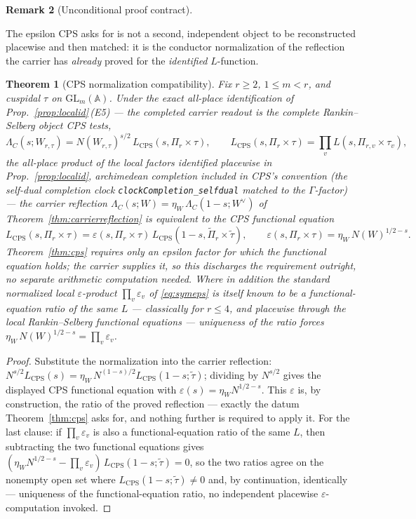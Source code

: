 \documentclass[11pt]{article}
\newtheorem{theorem}{Theorem}
\theoremstyle{definition}
\newtheorem{remark}[theorem]{Remark}
\begin{document}
\begin{remark}[Unconditional proof contract]
\begin{enumerate}
\noindent The epsilon CPS asks for is not a second, independent object to be reconstructed placewise and then
matched: it is the conductor normalization of the reflection the carrier has \emph{already} proved for the
\emph{identified} $L$-function.

\begin{theorem}[CPS normalization compatibility]\label{thm:cpsnorm}
Fix $r\ge2$, $1\le m<r$, and cuspidal $\tau$ on $\mathrm{GL}_m(\mathbb A)$. Under the exact all-place
identification of Prop.~\ref{prop:localid}\,\textup{(E5)} --- the completed carrier readout \emph{is} the
complete Rankin--Selberg object CPS tests,
\[
  \Lambda_C(s;W_{r,\tau})=N(W_{r,\tau})^{s/2}\,L_{\mathrm{CPS}}(s,\Pi_r\times\tau),\qquad
  L_{\mathrm{CPS}}(s,\Pi_r\times\tau)=\prod_v L(s,\Pi_{r,v}\times\tau_v),
\]
the all-place product of the local factors identified placewise in Prop.~\ref{prop:localid}, archimedean
completion included in CPS's convention (the self-dual completion clock
\texttt{clockCompletion\_selfdual} matched to the $\Gamma$-factor) --- the carrier reflection
$\Lambda_C(s;W)=\eta_W\,\Lambda_C(1-s;W^\vee)$ of Theorem~\ref{thm:carrierreflection} is \emph{equivalent} to the
CPS functional equation
\[
  L_{\mathrm{CPS}}(s,\Pi_r\times\tau)=\varepsilon(s,\Pi_r\times\tau)\,
  L_{\mathrm{CPS}}(1-s,\widetilde\Pi_r\times\widetilde\tau),\qquad
  \varepsilon(s,\Pi_r\times\tau)=\eta_W\,N(W)^{1/2-s}.
\]
Theorem~\ref{thm:cps} requires only \emph{an} epsilon factor for which the functional equation holds; the
carrier supplies it, so this discharges the requirement outright, no separate arithmetic computation needed.
Where in addition the standard normalized local $\varepsilon$-product $\prod_v\varepsilon_v$ of
\eqref{eq:symeps} is itself known to be a functional-equation ratio of the same $L$ --- classically for
$r\le4$, and placewise through the local Rankin--Selberg functional equations --- uniqueness of the ratio
forces $\eta_W\,N(W)^{1/2-s}=\prod_v\varepsilon_v$.
\end{theorem}
\begin{proof}
Substitute the normalization into the carrier reflection:
$N^{s/2}L_{\mathrm{CPS}}(s)=\eta_W\,N^{(1-s)/2}L_{\mathrm{CPS}}(1-s;\widetilde\tau)$; dividing by $N^{s/2}$
gives the displayed CPS functional equation with $\varepsilon(s)=\eta_W N^{1/2-s}$. This $\varepsilon$ is,
by construction, the ratio of the proved reflection --- exactly the datum Theorem~\ref{thm:cps} asks for,
and nothing further is required to apply it. For the last clause: if $\prod_v\varepsilon_v$ is also a
functional-equation ratio of the same $L$, then subtracting the two functional equations gives
$(\eta_W N^{1/2-s}-\prod_v\varepsilon_v)\,L_{\mathrm{CPS}}(1-s;\widetilde\tau)=0$, so the two ratios agree on
the nonempty open set where $L_{\mathrm{CPS}}(1-s;\widetilde\tau)\ne0$ and, by continuation, identically ---
uniqueness of the functional-equation ratio, no independent placewise $\varepsilon$-computation invoked.
\end{proof}


\end{enumerate}
\end{remark}
\end{document}
